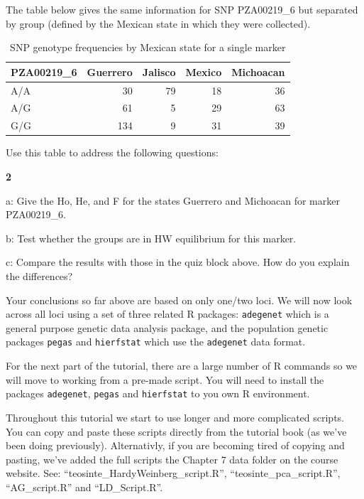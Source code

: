 \documentclass[
]{book}
\makeatletter
\newenvironment{kframe}{%
\medskip{}
\setlength{\fboxsep}{.8em}
 \def\at@end@of@kframe{}%
 \ifinner\ifhmode%
  \def\at@end@of@kframe{\end{minipage}}%
  \begin{minipage}{\columnwidth}%
 \fi\fi%
 \def\FrameCommand##1{\hskip\@totalleftmargin \hskip-\fboxsep
 \colorbox{shadecolor}{##1}\hskip-\fboxsep
     \hskip-\linewidth \hskip-\@totalleftmargin \hskip\columnwidth}%
 \MakeFramed {\advance\hsize-\width
   \@totalleftmargin\z@ \linewidth\hsize
   \@setminipage}}%
 {\par\unskip\endMakeFramed%
 \at@end@of@kframe}
\newenvironment{rmdblock}[1]
  {
  \begin{itemize}
  \renewcommand{\labelitemi}{
    \raisebox{-.7\height}[0pt][0pt]{
      {\setkeys{Gin}{width=3em,keepaspectratio}\texttt{[image: images/\#1]}}
    }
  }
  \setlength{\fboxsep}{1em}
  \begin{kframe}
  \item
  }
  {
  \end{kframe}
  \end{itemize}
  }
\newenvironment{rmdnote}
  {\begin{rmdblock}{note}}
  {\end{rmdblock}}
\newenvironment{rmdquiz}
  {\begin{rmdblock}{quiz}}
  {\end{rmdblock}}
\makeatother
\begin{document}
The table below gives the same information for SNP PZA00219\_6 but separated by group (defined by the Mexican state in which they were collected).

\begin{table}

\caption{\label{tab:unnamed-chunk-266}SNP genotype frequencies by Mexican state for a single marker}
\centering
\begin{tabular}[t]{lrrrr}
\toprule
PZA00219\_6 & Guerrero & Jalisco & Mexico & Michoacan\\
\midrule
A/A & 30 & 79 & 18 & 36\\
A/G & 61 & 5 & 29 & 63\\
G/G & 134 & 9 & 31 & 39\\
\bottomrule
\end{tabular}
\end{table}

Use this table to address the following questions:

\begin{rmdquiz}
\textbf{2}

a: Give the Ho, He, and F for the states Guerrero and Michoacan for marker PZA00219\_6.

b: Test whether the groups are in HW equilibrium for this marker.

c: Compare the results with those in the quiz block above. How do you explain the differences?
\end{rmdquiz}

Your conclusions so far above are based on only one/two loci. We will now look across all loci using a set of three related R packages: \texttt{adegenet} \citep{adegenet2008} which is a general purpose genetic data analysis package, and the population genetic packages \texttt{pegas} \citep{R-pegas} and \texttt{hierfstat} \citep{R-hierfstat} which use the \texttt{adegenet} data format.

For the next part of the tutorial, there are a large number of R commands so we will move to working from a pre-made script. You will need to install the packages \texttt{adegenet}, \texttt{pegas} and \texttt{hierfstat} to you own R environment.

\begin{rmdnote}
Throughout this tutorial we start to use longer and more complicated scripts. You can copy and paste these scripts directly from the tutorial book (as we've been doing previously). Alternativly, if you are becoming tired of copying and pasting, we've added the full scripts the Chapter 7 data folder on the course website. See: ``teosinte\_HardyWeinberg\_script.R'', ``teosinte\_pca\_script.R'', ``AG\_script.R'' and ``LD\_Script.R''.
\end{rmdnote}
\end{document}

